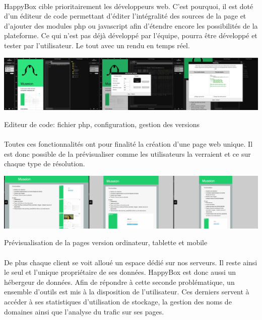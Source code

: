 \documentclass[11pt, a4paper ]{article}
\begin{document}
\begin{spacing}{1.5}
\paragraph{} %
HappyBox cible prioritairement les développeurs web. C'est pourquoi, il est doté d'un éditeur de code permettant d'éditer l'intégralité des sources de la page et d'ajouter des modules php ou javascript afin d'étendre encore les possibilités de la plateforme. Ce qui n'est pas déjà développé par l'équipe, pourra être développé et tester par l'utilisateur. Le tout avec un rendu en temps réel.
\begin{center}
	\includegraphics[width=\textwidth]{images/HBscreen/codeManager.png}
	\caption{Editeur de code: fichier php, configuration, gestion des versions}
\end{center}

\paragraph{}

Toutes ces fonctionnalités ont pour finalité la création d'une page web unique. Il est donc possible de la prévisualiser comme les utilisateurs la verraient et ce sur chaque type de résolution.
\begin{center}
	\includegraphics[width=\textwidth]{images/HBscreen/preview.png}
	\caption{Prévisualisation de la pages version ordinateur, tablette et mobile}
\end{center}

\paragraph{}
De plus chaque client se voit alloué un espace dédié sur nos serveurs. Il reste ainsi le seul et l'unique propriétaire de ses données. HappyBox est donc aussi un hébergeur de données. Afin de répondre à cette seconde problématique, un ensemble d'outils est mis à la disposition de l'utilisateur. Ces derniers servent à accéder à ses statistiques d'utilisation de stockage, la gestion des noms de domaines ainsi que l'analyse du trafic sur ses pages.


\end{spacing}
\end{document}

